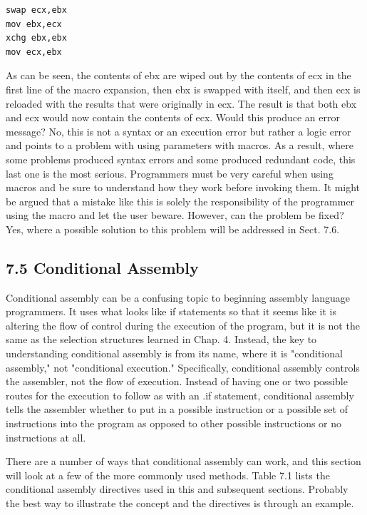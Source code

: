\documentclass[10pt]{article}
\begin{document}
\begin{verbatim}
swap ecx,ebx
mov ebx,ecx
xchg ebx,ebx
mov ecx,ebx
\end{verbatim}

As can be seen, the contents of ebx are wiped out by the contents of ecx in the first line of the macro expansion, then ebx is swapped with itself, and then ecx is reloaded with the results that were originally in ecx. The result is that both ebx and ecx would now contain the contents of ecx. Would this produce an error message? No, this is not a syntax or an execution error but rather a logic error and points to a problem with using parameters with macros. As a result, where some problems produced syntax errors and some produced redundant code, this last one is the most serious. Programmers must be very careful when using macros and be sure to understand how they work before invoking them. It might be argued that a mistake like this is solely the responsibility of the programmer using the macro and let the user beware. However, can the problem be fixed? Yes, where a possible solution to this problem will be addressed in Sect. 7.6.

\subsection*{7.5 Conditional Assembly}
Conditional assembly can be a confusing topic to beginning assembly language programmers. It uses what looks like if statements so that it seems like it is altering the flow of control during the execution of the program, but it is not the same as the selection structures learned in Chap. 4. Instead, the key to understanding conditional assembly is from its name, where it is "conditional assembly," not "conditional execution." Specifically, conditional assembly controls the assembler, not the flow of execution. Instead of having one or two possible routes for the execution to follow as with an .if statement, conditional assembly tells the assembler whether to put in a possible instruction or a possible set of instructions into the program as opposed to other possible instructions or no instructions at all.

There are a number of ways that conditional assembly can work, and this section will look at a few of the more commonly used methods. Table 7.1 lists the conditional assembly directives used in this and subsequent sections. Probably the best way to illustrate the concept and the directives is through an example.
\end{document}
